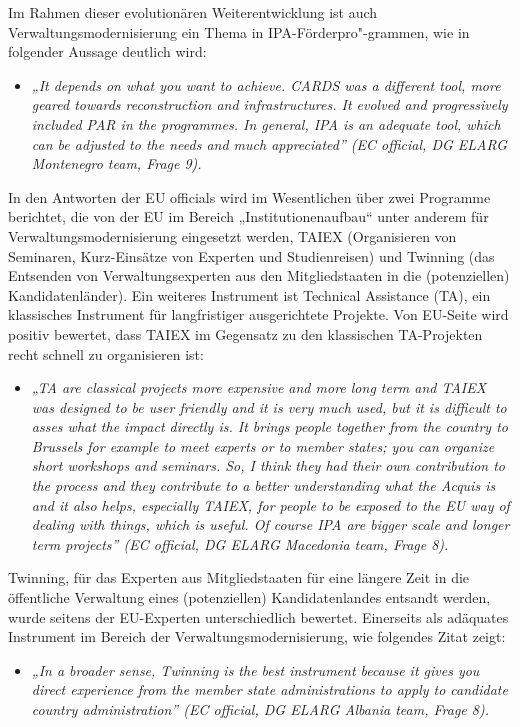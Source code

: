 Im Rahmen dieser evolutionären Weiterentwicklung ist auch Verwaltungsmodernisierung ein Thema in IPA-Förderpro"-grammen, wie in folgender Aussage deutlich wird:
\begin{itemize}[label={}]
\item \textit{„It depends on what you want to achieve. CARDS was a different tool, more geared towards reconstruction and infrastructures. It evolved and progressively included PAR in the programmes. In general, IPA is an adequate tool, which can be adjusted to the needs and much appreciated” (EC official, DG ELARG Montenegro team, Frage 9).}
\end{itemize}
In den Antworten der EU officials wird im Wesentlichen über zwei Programme berichtet, die von der EU im Bereich „Institutionenaufbau“ unter anderem für Verwaltungsmodernisierung eingesetzt werden, TAIEX (Organisieren von Seminaren, Kurz-Einsätze von Experten und Studienreisen) und Twinning (das Entsenden von Verwaltungsexperten aus den Mitgliedstaaten in die (potenziellen) Kandidatenländer). Ein weiteres Instrument ist Technical Assistance (TA), ein klassisches Instrument für langfristiger ausgerichtete Projekte. Von EU-Seite wird positiv bewertet, dass TAIEX im Gegensatz zu den klassischen TA-Projekten recht schnell zu organisieren ist:
\begin{itemize}[label={}]
\item \textit{„TA are classical projects more expensive and more long term and TAIEX was designed to be user friendly and it is very much used, but it is difficult to asses what the impact directly is. It brings people together from the country to Brussels for example to meet experts or to member states; you can organize short workshops and seminars. So, I think they had their own contribution to the process and they contribute to a better understanding what the Acquis is and it also helps, especially TAIEX, for people to be exposed to the EU way of dealing with things, which is useful. Of course IPA are bigger scale and longer term projects” (EC official, DG ELARG Macedonia team, Frage 8).}
\end{itemize}
Twinning, für das Experten aus Mitgliedstaaten für eine längere Zeit in die öffentliche Verwaltung eines (potenziellen) Kandidatenlandes entsandt werden, wurde seitens der EU-Experten unterschiedlich bewertet. Einerseits als adäquates Instrument im Bereich der Verwaltungsmodernisierung, wie folgendes Zitat zeigt:
\begin{itemize}[label={}]
\item \textit{„In a broader sense, Twinning is the best instrument because it gives you direct experience from the member state administrations to apply to candidate country administration” (EC official, DG ELARG Albania team, Frage 8). }
\end{itemize}

